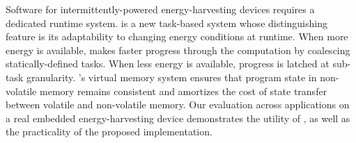 Software for intermittently-powered energy-harvesting devices requires a dedicated runtime system. \sys is a new task-based system whose distinguishing feature is its adaptability to changing energy conditions at runtime. When more energy is available, \sys makes faster progress through the computation by coalescing statically-defined tasks. When less energy is available, progress is latched at sub-task granularity. \sys's virtual memory system ensures that program state in non-volatile memory remains consistent and amortizes the cost of state transfer between volatile and non-volatile memory. Our evaluation across applications on a real embedded energy-harvesting device demonstrates the utility of \sys, as well as the practicality of the proposed implementation.